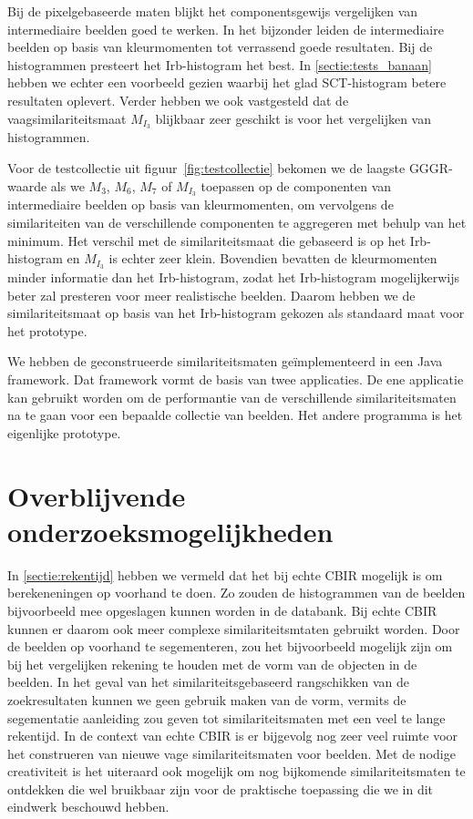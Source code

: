 Bij de pixelgebaseerde maten blijkt het componentsgewijs vergelijken van intermediaire
beelden goed te werken. In het bijzonder leiden de intermediaire beelden op basis van 
kleurmomenten tot verrassend goede resultaten. Bij de histogrammen presteert het 
Irb-histogram het best. In \ref{sectie:tests_banaan} hebben we echter een voorbeeld 
gezien waarbij het glad SCT-histogram betere resultaten oplevert. Verder hebben we
ook vastgesteld dat de vaagsimilariteitsmaat $M_{I_3}$ blijkbaar zeer 
geschikt is voor het vergelijken van histogrammen.

Voor de testcollectie uit figuur~\ref{fig:testcollectie} bekomen we de laagste 
GGGR-waarde als we $M_3$, $M_6$, $M_7$ of $M_{I_3}$ toepassen op 
de componenten
van intermediaire beelden op basis van kleurmomenten, om vervolgens de
similariteiten van de verschillende componenten te aggregeren met behulp van
het minimum. Het verschil met de 
similariteitsmaat die gebaseerd is op het Irb-histogram en $M_{I_3}$ is echter 
zeer klein. Bovendien bevatten de kleurmomenten minder informatie dan het
Irb-histogram, zodat het Irb-histogram mogelijkerwijs beter zal presteren voor
meer realistische beelden. Daarom hebben we de similariteitsmaat op basis
van het Irb-histogram gekozen als standaard maat voor het prototype.

We hebben de geconstrueerde similariteitsmaten ge\"implementeerd in een
Java framework. Dat framework vormt de basis van twee applicaties. De ene
applicatie kan gebruikt worden om de performantie van de
verschillende similariteitsmaten na te gaan voor een bepaalde collectie
van beelden. Het andere programma is het eigenlijke prototype.

\section{Overblijvende onderzoeksmogelijkheden}

In \ref{sectie:rekentijd} hebben we vermeld dat het bij echte CBIR mogelijk is
om berekeneningen op voorhand te doen. Zo zouden de histogrammen van de beelden
bijvoorbeeld mee opgeslagen kunnen worden in de databank. Bij echte CBIR kunnen
er daarom ook meer complexe similariteitsmtaten gebruikt worden. Door de beelden
op voorhand te segementeren, zou het bijvoorbeeld mogelijk zijn om bij het vergelijken
rekening te houden met de vorm van de objecten in de beelden. In het 
geval van het similariteitsgebaseerd rangschikken van de zoekresultaten kunnen we 
geen gebruik maken van de vorm, vermits de segementatie aanleiding zou geven tot 
similariteitsmaten met een veel te lange rekentijd. In de context van echte CBIR is 
er bijgevolg nog zeer veel ruimte voor het construeren van nieuwe vage 
similariteitsmaten voor beelden. Met de nodige creativiteit is het uiteraard ook 
mogelijk om nog bijkomende similariteitsmaten te ontdekken die wel bruikbaar 
zijn voor de praktische toepassing die we in dit eindwerk beschouwd hebben.

